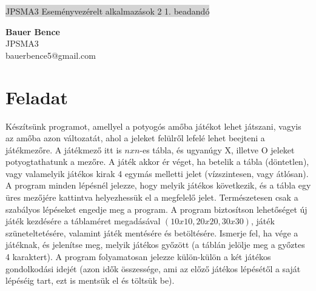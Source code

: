 \documentclass[11pt,a4paper]{article}
\begin{document}
\renewcommand{\labelitemi}{\textbullet}
\def\br{\\[0.1cm]}
\thispagestyle{empty}
\begin{center}
	\colorbox{lightgray}{{\large JPSMA3} \hspace{3cm} {\large Eseményvezérelt alkalmazások 2 1. beadandó} \hspace{5cm} \thepage}
\end{center}
\begin{framed}
	\begin{flushleft}
		{\large \textbf{Bauer Bence}}
		\hspace{5.4cm}{\large 2018.10.06.}\br
		{\large JPSMA3}\br
		{\large bauerbence5@gmail.com}
	\end{flushleft}
\end{framed}
\section{Feladat}
Készítsünk programot, amellyel a potyogós amőba játékot lehet játszani, vagyis
az amőba azon változatát, ahol a jeleket felülről lefelé lehet beejteni a
játékmezőre. A játékmező itt is $nxn$-es tábla, és ugyanúgy X, illetve O jeleket
potyogtathatunk a mezőre. A játék akkor ér véget, ha betelik a tábla (döntetlen),
vagy valamelyik játékos kirak 4 egymás melletti jelet (vízszintesen, vagy átlósan).
A program minden lépésnél jelezze, hogy melyik játékos következik, és a tábla
egy üres mezőjére kattintva helyezhessük el a megfelelő jelet. Természetesen
csak a szabályos lépéseket engedje meg a program.
A program biztosítson lehetőséget új játék kezdésére a táblaméret megadásával
$(10 x 10, 20 x 20, 30 x 30)$, játék szüneteltetésére, valamint játék mentésére és
betöltésére. Ismerje fel, ha vége a játéknak, és jelenítse meg, melyik játékos
győzött (a táblán jelölje meg a győztes 4 karaktert). A program folyamatosan
jelezze külön-külön a két játékos gondolkodási idejét (azon idők összessége, ami
az előző játékos lépésétől a saját lépéséig tart, ezt is mentsük el és töltsük be).
\end{document}
